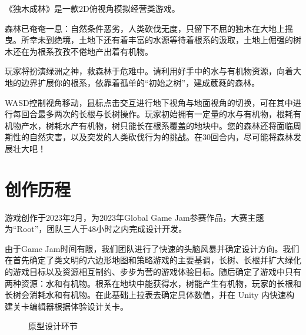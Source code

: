 


《独木成林》是一款2D俯视角模拟经营类游戏。

森林已奄奄一息：自然条件恶劣，人类砍伐无度，只留下不屈的独木在大地上摇曳。所幸未到绝境，土地下还有着丰富的水源等待着根系的汲取，土地上倔强的树木还在为根系孜孜不倦地产出着有机物。

玩家将扮演绿洲之神，救森林于危难中。请利用好手中的水与有机物资源，向着大地的边界扩展你的根系，依靠着孤单的“初始之树”，建成葳蕤的森林。

WASD控制视角移动，鼠标点击交互进行地下视角与地面视角的切换，可在其中进行每回合最多两次的长根与长树操作。玩家初始拥有一定量的水与有机物，根耗有机物产水，树耗水产有机物，树只能长在根系覆盖的地块中。您的森林还将面临周期性的自然灾害，以及突发的人类砍伐行为的挑战。在30回合内，尽可能将森林发展壮大吧！

\section{创作历程}

游戏创作于2023年2月，为2023年Global Game Jam参赛作品，大赛主题为“Root”，团队三人于48小时之内完成设计开发。

由于Game Jam时间有限，我们团队进行了快速的头脑风暴并确定设计方向。我们在首先确定了类文明的六边形地图和策略游戏的主要基调，长树、长根并扩大绿化的游戏目标以及资源相互制约、步步为营的游戏体验目标。随后确定了游戏中只有两种资源：水和有机物。根系在地块中能获得水，树能产生有机物，玩家的长根和长树会消耗水和有机物。在此基础上拉表去确定具体数值，并在 Unity 内快速构建关卡编辑器根据体验设计关卡。

\begin{figure}[H]
\centering  %
\caption{原型设计环节}
\end{figure}

